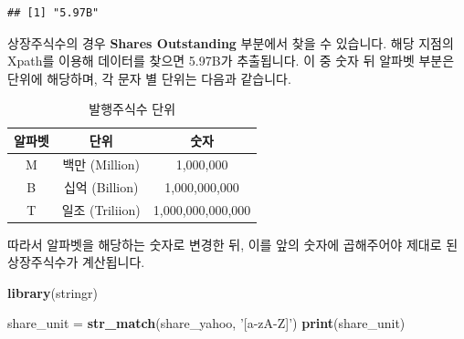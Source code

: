 \documentclass[12pt,]{book}
\newenvironment{Shaded}{\begin{snugshade}}{\end{snugshade}}
\newcommand{\DataTypeTok}[1]{\textcolor[rgb]{0.13,0.29,0.53}{#1}}
\newcommand{\KeywordTok}[1]{\textcolor[rgb]{0.13,0.29,0.53}{\textbf{#1}}}
\newcommand{\NormalTok}[1]{#1}
\newcommand{\OperatorTok}[1]{\textcolor[rgb]{0.81,0.36,0.00}{\textbf{#1}}}
\newcommand{\StringTok}[1]{\textcolor[rgb]{0.31,0.60,0.02}{#1}}
\begin{document}
\begin{Shaded}
\end{Shaded}

\begin{verbatim}
## [1] "5.97B"
\end{verbatim}

상장주식수의 경우 \textbf{Shares Outstanding} 부분에서 찾을 수 있습니다. 해당 지점의 Xpath를 이용해 데이터를 찾으면 5.97B가 추출됩니다. 이 중 숫자 뒤 알파벳 부분은 단위에 해당하며, 각 문자 별 단위는 다음과 같습니다.

\begin{table}[!h]

\caption{\label{tab:unnamed-chunk-36}발행주식수 단위}
\centering
\begin{tabular}{ccc}
\toprule
알파벳 & 단위 & 숫자\\
\midrule
\rowcolor{gray!6}  M & 백만 (Million) & 1,000,000\\
B & 십억 (Billion) & 1,000,000,000\\
\rowcolor{gray!6}  T & 일조 (Triliion) & 1,000,000,000,000\\
\bottomrule
\end{tabular}
\end{table}

따라서 알파벳을 해당하는 숫자로 변경한 뒤, 이를 앞의 숫자에 곱해주어야 제대로 된 상장주식수가 계산됩니다.

\begin{Shaded}
\begin{Highlighting}[]
\KeywordTok{library}\NormalTok{(stringr)}

\NormalTok{share_unit =}\StringTok{ }\KeywordTok{str_match}\NormalTok{(share_yahoo, }\StringTok{'[a-zA-Z]'}\NormalTok{)}
\KeywordTok{print}\NormalTok{(share_unit)}
\end{Highlighting}
\end{Shaded}
\end{document}
